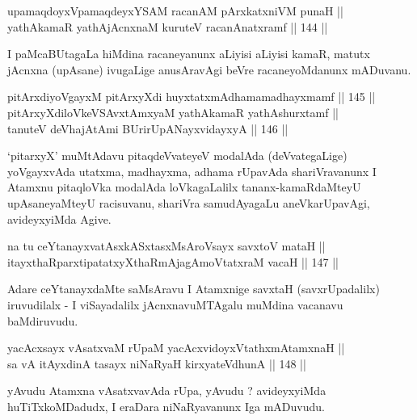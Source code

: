 \begin{shl}
upamaqdoyxVpamaqdeyxYSAM racanAM pArxkatxniVM punaH || \\
yathAkamaR yathAjAcnxnaM kuruteV racanAnatxramf \hfill || 144 ||  
\end{shl}

\begin{artha}
I paMcaBUtagaLa hiMdina racaneyanunx aLiyisi aLiyisi kamaR, matutx
jAcnxna (upAsane) ivugaLige anusAravAgi beVre racaneyoMdanunx mADuvanu.
\end{artha}


\begin{shl}
pitArxdiyoVgayxM pitArxyXdi huyxtatxmAdhamamadhayxmamf \hfill || 145 ||  \\
pitArxyXdiloVkeVSAvxtAmx\s yaM yathAkamaR yathAshurxtamf ||  \\
tanuteV deVhajAtAmi BUrirUpANayxvidayxyA \hfill || 146 ||  
\end{shl}

\begin{artha}
`pitarxyX' muMtAdavu pitaqdeVvateyeV modalAda (deVvategaLige)
yoVgayxvAda utatxma, madhayxma, adhama rUpavAda shariVravanunx I
Atamxnu pitaqloVka modalAda loVkagaLalilx tananx-kamaRdaMteyU
upAsaneyaMteyU racisuvanu, shariVra samudAyagaLu aneVkarUpavAgi,
avideyxyiMda Agive.
\end{artha}

\begin{shl}
na tu ceYtanayxvatAsxkASxtasxMsAroV\s sayx savxtoV mataH || \\
itayxthaRparxtipatatxyXthaRmAjagAmoVtatxraM vacaH \hfill || 147 ||  
\end{shl}

\begin{artha}
Adare ceYtanayxdaMte saMsAravu I Atamxnige savxtaH (savxrUpadalilx)
iruvudilalx - I viSayadalilx jAcnxnavuMTAgalu muMdina vacanavu baMdiruvudu.
\end{artha}

\begin{shl}
yacAcxsayx vAsatxvaM rUpaM yacAcxvidoyxVtathxmAtamxnaH || \\
sa vA itAyxdinA tasayx niNaRyaH kirxyateV\s dhunA || 148 ||
\end{shl}

\begin{artha}
yAvudu Atamxna vAsatxvavAda rUpa, yAvudu ? avideyxyiMda
huTiTxkoMDadudx, I eraDara niNaRyavanunx Iga mADuvudu.
\end{artha}

